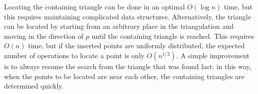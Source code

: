 Locating the containing triangle can be done in an optimal $O(\log n)$ time, but
this requires maintaining complicated data structures. Alternatively, the
triangle can be located by starting from an arbitrary place in the triangulation
and moving in the direction of $p$ until the containing triangle is reached.
This requires $O(n)$ time, but if the inserted points are uniformly distributed,
the expected number of operations to locate a point is only $O(n^{1/2})$. A
simple improvement is to always resume the search from the triangle that was
found last: in this way, when the points to be located are near each other, the
containing triangles are determined quickly.


% 
% 
% 
% 

